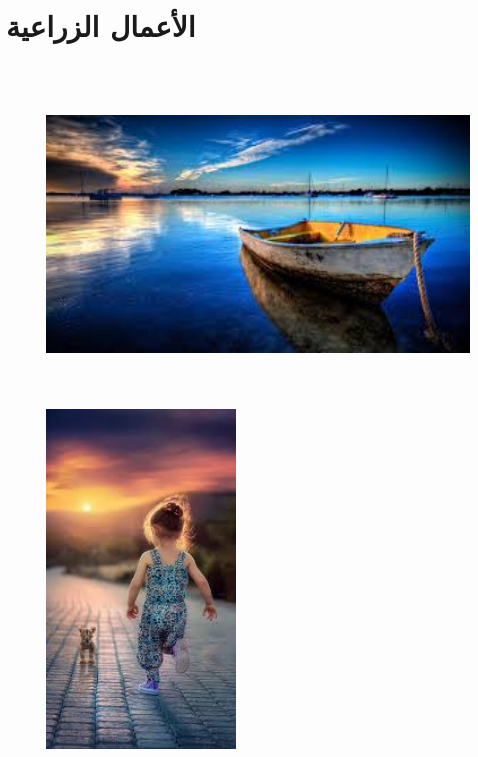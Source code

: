 \documentclass{article}
\begin{document}
\section{الأعمال الزراعية}
\begin{figure}[H]
    \centering

    \begin{minipage}{0.45\textwidth}
        \centering
        \includegraphics[height=9cm,width=\textwidth]{garden/1.jpg}
    \end{minipage}
    \hfill
    \begin{minipage}{0.45\textwidth}
        \centering
        \includegraphics[height=9cm,width=\textwidth]{garden/2.jpg}
    \end{minipage}
    \vspace{0.5cm} %


\end{figure}
\end{document}
